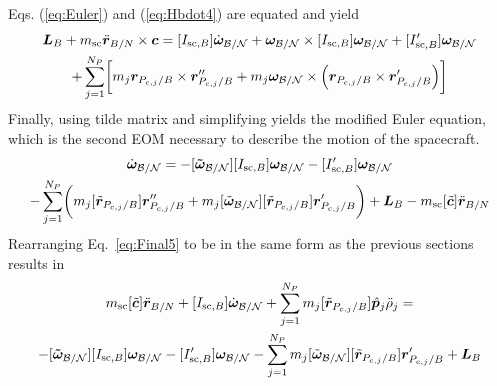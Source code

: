 Eqs. (\ref{eq:Euler}) and (\ref{eq:Hbdot4}) are equated and yield
\begin{multline}
	\bm{L}_B+m_{\text{sc}}\ddot{\bm r}_{B/N}\times\bm{c} = [I_{\text{sc},B}] \dot{\bm\omega}_{\cal B/N} + \bm\omega_{\cal B/N} \times [I_{\text{sc},B}] \bm\omega_{\cal B/N} + [I'_{\text{sc},B}] \bm\omega_{\cal B/N}
	\\+ \sum\limits_{j=1}^{N_P}\biggl[m_j \bm r_{P_{c,j}/B}\times\bm{r}''_{P_{c,j}/B}
	+ m_j \bm\omega_{\cal B/N} \times \Bigl(\bm{r}_{P_{c,j}/B} \times \bm{r}'_{P_{c,j}/B}\Bigr)\biggr]
	\label{eq:Hbdot5}
\end{multline}
Finally, using tilde matrix and simplifying yields the modified Euler equation, which is the second EOM necessary to describe the motion of the spacecraft.
\begin{multline}
	[I_{\text{sc},B}] \dot{\bm\omega}_{\cal B/N} = -[\bm{\tilde{\omega}}_{\cal B/N}] [I_{\text{sc},B}] \bm\omega_{\cal B/N} - [I'_{\text{sc},B}] \bm\omega_{\cal B/N}	\\- \sum\limits_{j=1}^{N_P}\biggl(m_j [\tilde{\bm r}_{P_{c,j}/B}]\bm{r}''_{P_{c,j}/B}
	+ m_j [\tilde{\bm\omega}_{\cal B/N}] [\tilde{\bm{r}}_{P_{c,j}/B}] \bm{r}'_{P_{c,j}/B}\biggr) 
	+ \bm{L}_B - m_{\text{sc}} [\tilde{\bm{c}}] \ddot{\bm r}_{B/N}
	\label{eq:Final5}
\end{multline}
Rearranging Eq.~\eqref{eq:Final5} to be in the same form as the previous sections results in
\begin{multline}
	m_{\text{sc}}[\tilde{\bm{c}}]\ddot{\bm r}_{B/N}+[I_{\text{sc},B}] \dot{\bm\omega}_{\cal B/N} + \sum\limits_{j=1}^{N_P}m_j [\tilde{\bm r}_{P_{c,j}/B}] \hat{\bm p}_j \ddot{\rho}_j = \\
	-[\bm{\tilde{\omega}}_{\cal B/N}] [I_{\text{sc},B}] \bm\omega_{\cal B/N} 
	- [I'_{\text{sc},B}] \bm\omega_{\cal B/N} 	- \sum\limits_{j=1}^{N_P} m_j [\tilde{\bm\omega}_{\cal B/N}] [\tilde{\bm{r}}_{P_{c,j}/B}] \bm{r}'_{P_{c,j}/B} + \bm{L}_B
	\label{eq:Final6}
\end{multline} 

